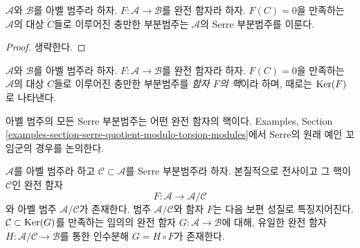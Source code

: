 \begin{lemma}
\label{lemma-kernel-exact-functor}
$\mathcal{A}$와 $\mathcal{B}$를 아벨 범주라 하자.
$F : \mathcal{A} \to \mathcal{B}$를 완전 함자라 하자.
$F(C) = 0$을 만족하는 $\mathcal{A}$의 대상 $C$들로 이루어진
충만한 부분범주는 $\mathcal{A}$의 Serre 부분범주를 이룬다.
\end{lemma}

\begin{proof}
생략한다.
\end{proof}

\begin{definition}
\label{definition-kernel-category}
$\mathcal{A}$와 $\mathcal{B}$를 아벨 범주라 하자.
$F : \mathcal{A} \to \mathcal{B}$를 완전 함자라 하자.
$F(C) = 0$을 만족하는 $\mathcal{A}$의 대상 $C$들로 이루어진
충만한 부분범주를 {\it 함자 $F$의 핵}이라 하며, 때로는
$\mathop{\mathrm{Ker}}(F)$로 나타낸다.
\end{definition}

\noindent
아벨 범주의 모든 Serre 부분범주는 어떤 완전 함자의 핵이다.
Examples, Section
\ref{examples-section-serre-quotient-modulo-torsion-modules}에서
Serre의 원래 예인 꼬임군의 경우를 논의한다.

\begin{lemma}
\label{lemma-serre-subcategory-is-kernel}
$\mathcal{A}$를 아벨 범주라 하고
$\mathcal{C} \subset \mathcal{A}$를 Serre 부분범주라 하자.
본질적으로 전사이고 그 핵이 $\mathcal{C}$인 완전 함자
$$
F : \mathcal{A} \longrightarrow \mathcal{A}/\mathcal{C}
$$
와 아벨 범주 $\mathcal{A}/\mathcal{C}$가 존재한다.
범주 $\mathcal{A}/\mathcal{C}$와 함자 $F$는 다음 보편 성질로
특징지어진다. $\mathcal{C} \subset \mathop{\mathrm{Ker}}(G)$를 만족하는 임의의 완전
함자 $G : \mathcal{A} \to \mathcal{B}$에 대해, 유일한 완전 함자
$H : \mathcal{A}/\mathcal{C} \to \mathcal{B}$를 통한 인수분해
$G = H \circ F$가 존재한다.
\end{lemma}

